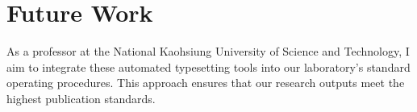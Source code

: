 \documentclass[11pt, a4paper]{article}
\begin{document}
\section{Future Work}
As a professor at the National Kaohsiung University of Science and Technology, I aim to integrate these automated typesetting tools into our laboratory's standard operating procedures. This approach ensures that our research outputs meet the highest publication standards.

\printbibliography
\end{document}
